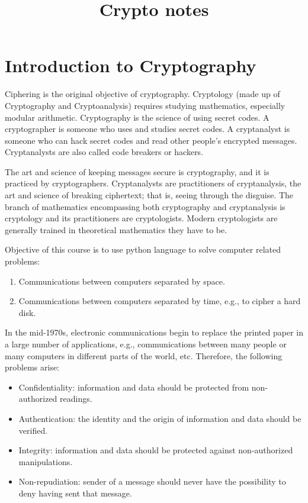 \documentclass{article}
\title{Crypto notes}
\begin{document}
\date{}
\maketitle
\author{}
\date{}

\maketitle
\section{Introduction to Cryptography}
Ciphering is the original objective of cryptography. 
Cryptology (made up of Cryptography and Cryptoanalysis) requires studying mathematics, especially modular arithmetic.
Cryptography is the science of using secret codes. A cryptographer is someone who uses and
studies secret codes. A cryptanalyst is someone who can
hack secret codes and read other people’s encrypted messages. Cryptanalysts are also called code
breakers or hackers.

The art and science of keeping messages secure is cryptography, and it is practiced by
cryptographers. Cryptanalysts are practitioners of cryptanalysis, the art and science
of breaking ciphertext; that is, seeing through the disguise. The branch of mathematics
encompassing both cryptography and cryptanalysis is cryptology and its practitioners
are cryptologists. Modern cryptologists are generally trained in theoretical mathematics
they have to be.

Objective of this course is to use python language to solve computer related problems:
\begin{enumerate}
    \item Communications between computers separated by space.
    \item Communications between computers separated by time, e.g., to cipher a hard disk.
\end{enumerate}

In the mid-1970s, electronic communications begin
to replace the printed paper in a large number
of applications, e.g., communications between many people or many
computers in different parts of the world, etc.
Therefore, the following problems arise:
\begin{itemize}
    \item Confidentiality: information and data should be protected from non-authorized readings.
    \item Authentication: the identity and the origin of information and data should be verified.
    \item Integrity: information and data should be protected against non-authorized manipulations.
    \item Non-repudiation: sender of a message should never have the possibility to deny having sent that message.
\end{itemize}
\end{document}
